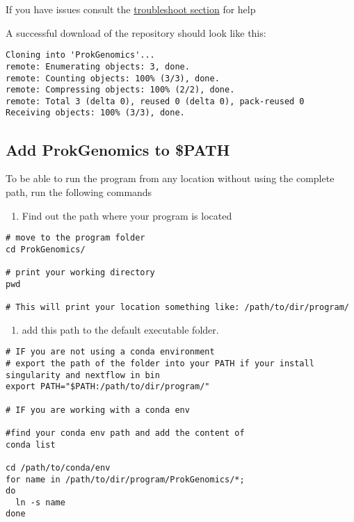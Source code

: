 \documentclass[
]{book}
\providecommand{\tightlist}{%
  \setlength{\itemsep}{0pt}\setlength{\parskip}{0pt}}
\begin{document}
If you have issues consult the \href{troubleshooting.html}{troubleshoot section} for help

A successful download of the repository should look like this:

\begin{verbatim}
Cloning into 'ProkGenomics'...
remote: Enumerating objects: 3, done.
remote: Counting objects: 100% (3/3), done.
remote: Compressing objects: 100% (2/2), done.
remote: Total 3 (delta 0), reused 0 (delta 0), pack-reused 0
Receiving objects: 100% (3/3), done.
\end{verbatim}

\hypertarget{add-prokgenomics-to-path}{%
\subsection{Add ProkGenomics to \$PATH}\label{add-prokgenomics-to-path}}

To be able to run the program from any location without using the complete path, run the following commands

\begin{enumerate}
\def\labelenumi{\arabic{enumi}.}
\tightlist
\item
  Find out the path where your program is located
\end{enumerate}

\begin{verbatim}
# move to the program folder
cd ProkGenomics/

# print your working directory
pwd 

# This will print your location something like: /path/to/dir/program/
\end{verbatim}

\begin{enumerate}
\def\labelenumi{\arabic{enumi}.}
\setcounter{enumi}{1}
\tightlist
\item
  add this path to the default executable folder.
\end{enumerate}

\begin{verbatim}
# IF you are not using a conda environment 
# export the path of the folder into your PATH if your install singularity and nextflow in bin
export PATH="$PATH:/path/to/dir/program/"

# IF you are working with a conda env

#find your conda env path and add the content of 
conda list

cd /path/to/conda/env
for name in /path/to/dir/program/ProkGenomics/*; 
do
  ln -s name
done
\end{verbatim}
\end{document}
